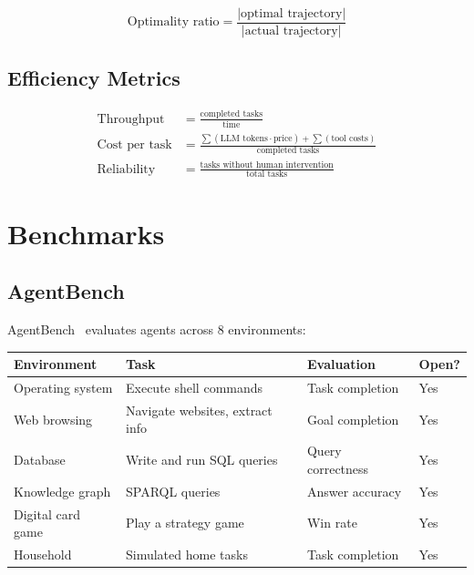 \begin{equation}
	\text{Optimality ratio} = \frac{|\text{optimal trajectory}|}{|\text{actual trajectory}|}
\end{equation}

\subsection{Efficiency Metrics}

\begin{align}
	\text{Throughput}    & = \frac{\text{completed tasks}}{\text{time}}                                                          \\
	\text{Cost per task} & = \frac{\sum(\text{LLM tokens} \cdot \text{price}) + \sum(\text{tool costs})}{\text{completed tasks}} \\
	\text{Reliability}   & = \frac{\text{tasks without human intervention}}{\text{total tasks}}
\end{align}

\section{Benchmarks}

\subsection{AgentBench}

AgentBench~\cite{liu2023agentbench} evaluates agents across 8 environments:

\begin{longtable}{p{3cm}p{4cm}p{4cm}p{3cm}}
	\toprule
	\textbf{Environment} & \textbf{Task}                   & \textbf{Evaluation} & \textbf{Open?} \\
	\midrule
	Operating system     & Execute shell commands          & Task completion     & Yes            \\
	Web browsing         & Navigate websites, extract info & Goal completion     & Yes            \\
	Database             & Write and run SQL queries       & Query correctness   & Yes            \\
	Knowledge graph      & SPARQL queries                  & Answer accuracy     & Yes            \\
	Digital card game    & Play a strategy game            & Win rate            & Yes            \\
	Household            & Simulated home tasks            & Task completion     & Yes            \\
	\bottomrule
\end{longtable}

